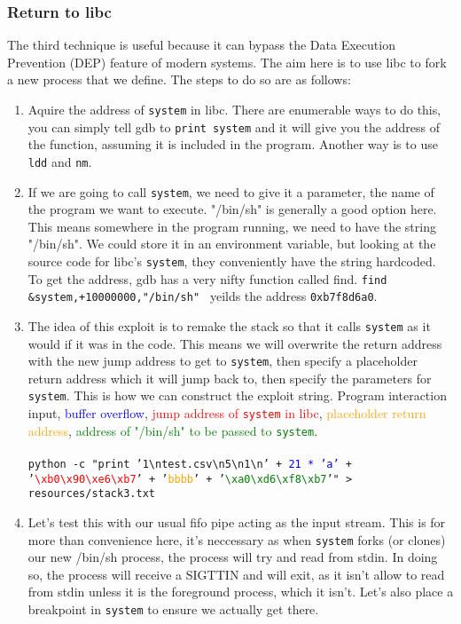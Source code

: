\documentclass[]{article}
\begin{document}
\subsubsection*{Return to libc}
The third technique is useful because it can bypass the Data Execution Prevention (DEP) feature of modern systems. The aim here is to use libc to fork a new process that we define. The steps to do so are as follows:
\begin{enumerate}
	\item Aquire the address of \texttt{system} in libc. There are enumerable ways to do this, you can simply tell gdb to \texttt{print system} and it will give you the address of the function, assuming it is included in the program. Another way is to use \texttt{ldd} and \texttt{nm}.
	\item If we are going to call \texttt{system}, we need to give it a parameter, the name of the program we want to execute. "/bin/sh" is generally a good option here. This means somewhere in the program running, we need to have the string "/bin/sh". We could store it in an environment variable, but looking at the source code for libc's \texttt{system}, they conveniently have the string hardcoded. To get the address, gdb has a very nifty function called find. \texttt{find \&system,+10000000,"/bin/sh" } yeilds the address \texttt{0xb7f8d6a0}.
	\item The idea of this exploit is to remake the stack so that it calls \texttt{system} as it would if it was in the code. This means we will overwrite the return address with the new jump address to get to \texttt{system}, then specify a placeholder return address which it will jump back to, then specify the parameters for \texttt{system}. This is how we can construct the exploit string. Program interaction input, \textcolor{blue}{buffer overflow}, \textcolor{red}{jump address of \texttt{system} in libc}, \textcolor{orange}{placeholder return address}, \textcolor{green}{address of "/bin/sh" to be passed to \texttt{system}}.
	\\
	\\
	\texttt{python -c "print '1{\textbackslash}ntest.csv{\textbackslash}n5{\textbackslash}n1{\textbackslash}n' + \textcolor{blue}{21 * 'a'} + '\textcolor{red}{{\textbackslash}xb0{\textbackslash}x90{\textbackslash}xe6{\textbackslash}xb7}' + '\textcolor{orange}{bbbb}' + '\textcolor{green}{{\textbackslash}xa0{\textbackslash}xd6{\textbackslash}xf8{\textbackslash}xb7}'" > resources/stack3.txt}
	\\
	\item Let's test this with our usual fifo pipe acting as the input stream. This is for more than convenience here, it's neccessary as when \texttt{system} forks (or clones) our new /bin/sh process, the process will try and read from stdin. In doing so, the process will receive a SIGTTIN and will exit, as it isn't allow to read from stdin unless it is the foreground process, which it isn't. Let's also place a breakpoint in \texttt{system} to ensure we actually get there.\\

\end{enumerate}
\end{document}

